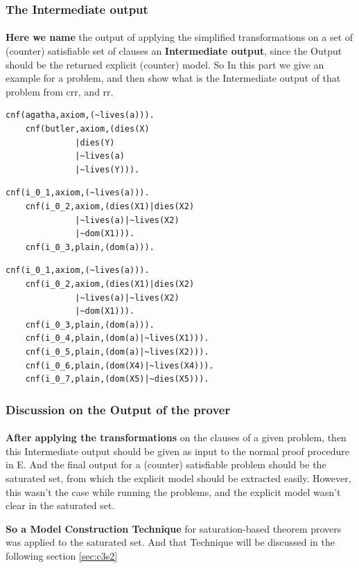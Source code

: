 	\subsubsection{The Intermediate output}
		\paragraph{}
		\textbf{Here we name} the output of applying the simplified transformations on a set of (counter) satisfiable set of clauses an \textbf{Intermediate output}, since the Output should be the returned explicit (counter) model. So In this part we give an example for a problem, and then show what is the Intermediate output of that problem from \ac{crr}, and \ac{rr}. 		
		

			\begin{lstlisting}[caption=Satisfiable CNF problem Example,frame=single]
	cnf(agatha,axiom,(~lives(a))).
	cnf(butler,axiom,(dies(X)
			  |dies(Y)
			  |~lives(a)
			  |~lives(Y))).		
			\end{lstlisting}		
		
			\begin{lstlisting}[caption=CRR output Example,frame=single]
	cnf(i_0_1,axiom,(~lives(a))).
	cnf(i_0_2,axiom,(dies(X1)|dies(X2)
			  |~lives(a)|~lives(X2)
			  |~dom(X1))).
	cnf(i_0_3,plain,(dom(a))).
			\end{lstlisting}		

			\begin{lstlisting}[caption=RR output Example,frame=single]
	cnf(i_0_1,axiom,(~lives(a))).
	cnf(i_0_2,axiom,(dies(X1)|dies(X2)
			  |~lives(a)|~lives(X2)
			  |~dom(X1))).
	cnf(i_0_3,plain,(dom(a))).
	cnf(i_0_4,plain,(dom(a)|~lives(X1))).
	cnf(i_0_5,plain,(dom(a)|~lives(X2))).
	cnf(i_0_6,plain,(dom(X4)|~lives(X4))).
	cnf(i_0_7,plain,(dom(X5)|~dies(X5))).
			\end{lstlisting}		


	\subsubsection{Discussion on the Output of the prover}
		\paragraph{}
		\textbf{After applying the transformations} on the clauses of a given problem, then this Intermediate output should be given as input to the normal proof procedure in E. And the final output for a (counter) satisfiable problem should be the saturated set, from which the explicit model should be extracted easily. However, this wasn't the case while running the problems, and the explicit model wasn't clear in the saturated set.
		
		\textbf{So a Model Construction Technique} for saturation-based theorem provers was applied to the saturated set. And that Technique will be discussed in the following section \ref{sec:c3s2}   		